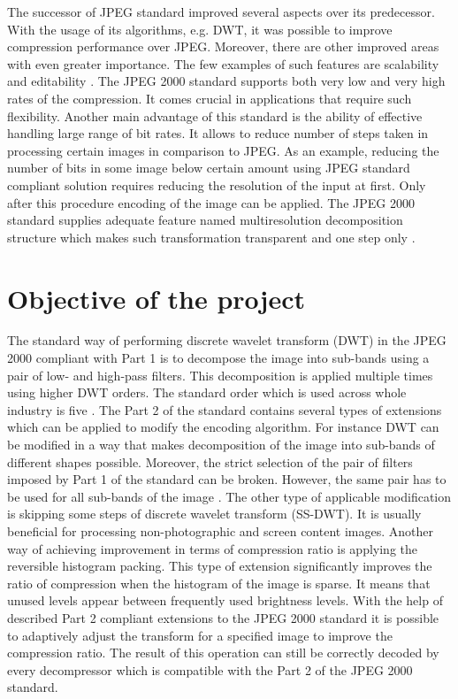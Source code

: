 The successor of JPEG standard improved several aspects over its predecessor. With the usage of its algorithms,
e.g. DWT, it was possible to improve compression performance over JPEG. Moreover, there are other improved areas
with even greater importance. The few examples of such features are scalability and editability \cite{jpeg2000}.
The JPEG 2000 standard supports both very low and very high rates of the compression. It comes crucial
in applications that require such flexibility. Another main advantage of this standard is the ability of
effective handling large range of bit rates. It allows to reduce number of steps taken in processing
certain images in comparison to JPEG. As an example, reducing the number of bits in some image below certain
amount using JPEG standard compliant solution requires reducing the resolution of the input at first.
Only after this procedure encoding of the image can be applied. The JPEG 2000 standard supplies adequate feature
named multiresolution decomposition structure which makes such transformation transparent and one step only \cite{jpeg2000}.


\section{Objective of the project}

The standard way of performing discrete wavelet transform (DWT) in the JPEG 2000 compliant with Part 1 is to decompose
the image into sub-bands using a pair of low- and high-pass filters. This decomposition is applied multiple times using
higher DWT orders. The standard order which is used across whole industry is five \cite{jpeg_suite} \cite{jpeg_summary}.
The Part 2 of the standard contains several types of extensions which can be applied to modify the encoding
algorithm. For instance DWT can be modified in a way that makes decomposition of the image into sub-bands of different
shapes possible. Moreover, the strict selection of the pair of filters imposed by Part 1 of the standard can be
broken. However, the same pair has to be used for all sub-bands of the image \cite{jpeg_suite}. The other type of applicable
modification is skipping some steps of discrete wavelet transform (SS-DWT). It is usually beneficial for processing
non-photographic and screen content images. Another way of achieving improvement in terms of compression ratio is
applying the reversible histogram packing. This type of extension significantly improves the ratio of compression
when the histogram of the image is sparse. It means that unused levels appear between frequently used brightness levels.
With the help of described Part 2 compliant extensions to the JPEG 2000 standard it is possible to adaptively
adjust the transform for a specified image to improve the compression ratio. The result of this operation can still
be correctly decoded by every decompressor which is compatible with the Part 2 of the JPEG 2000 standard.

